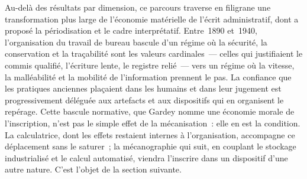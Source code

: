 
Au-delà des résultats par dimension, ce parcours traverse en filigrane une transformation plus large de l'économie matérielle de l'écrit administratif, dont \textcite{gardey_ecrire_2008} a proposé la périodisation et le cadre interprétatif. Entre~1890 et~1940, l'organisation du travail de bureau bascule d'un régime où la sécurité, la conservation et la traçabilité sont les valeurs cardinales~--- celles qui justifiaient le commis qualifié, l'écriture lente, le registre relié~--- vers un régime où la vitesse, la malléabilité et la mobilité de l'information prennent le pas. La confiance que les pratiques anciennes plaçaient dans les humains et dans leur jugement est progressivement déléguée aux artefacts et aux dispositifs qui en organisent le repérage. Cette bascule normative, que Gardey nomme une \og économie morale\fg{} de l'inscription, n'est pas le simple effet de la mécanisation~: elle en est la condition. La calculatrice, dont les effets restaient internes à l'organisation, accompagne ce déplacement sans le saturer~; la mécanographie qui suit, en couplant le stockage industrialisé et le calcul automatisé, viendra l'inscrire dans un dispositif d'une autre nature. C'est l'objet de la section suivante.



